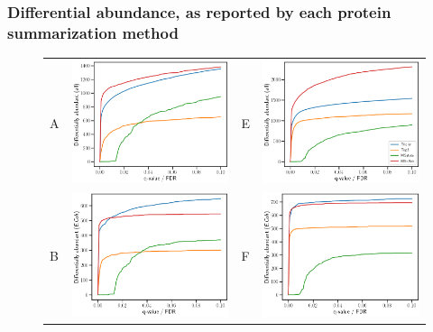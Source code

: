 \documentclass[11pt]{article}
\begin{document}
\subsubsection*{Differential abundance, as reported by each protein summarization method}
\begin{figure}[hbt]
    \centering
    \begin{tabular}{lclc} 
        A & \includegraphics[width=0.4\linewidth]{../../result/report_plots_filtered/osw_de_all.png} & 
        E & \includegraphics[width=0.4\linewidth]{../../result/report_plots_filtered/diann_de_all.png} \\ 
        B & \includegraphics[width=0.4\linewidth]{../../result/report_plots_filtered/osw_de_ecoli.png} & 
        F & \includegraphics[width=0.4\linewidth]{../../result/report_plots_filtered/diann_de_ecoli.png} \\ 

\end{tabular}
\end{figure}
\end{document}
